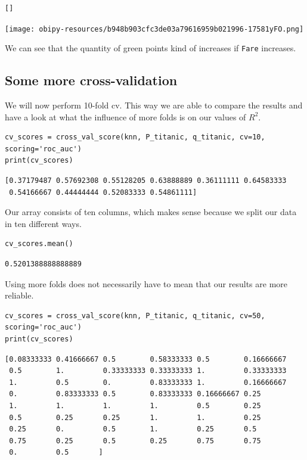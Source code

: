 \documentclass[11pt]{article}
\begin{document}
\begin{verbatim}
[]
\end{verbatim}



\begin{center}
\texttt{[image: obipy-resources/b948b903cfc3de03a79616959b021996-17581yFO.png]}
\end{center}

We can see that the quantity of green points kind of increases if  \texttt{Fare} increases.

\newpage
\subsection{Some more cross-validation}
\label{sec:orgd51032d}
We will now perform 10-fold cv. This way we are able to compare the results and have a look at what the influence of more folds is on our values of \(R^{2}\).

\begin{verbatim}
cv_scores = cross_val_score(knn, P_titanic, q_titanic, cv=10, scoring='roc_auc')
print(cv_scores)
\end{verbatim}

\begin{verbatim}
[0.37179487 0.57692308 0.55128205 0.63888889 0.36111111 0.64583333
 0.54166667 0.44444444 0.52083333 0.54861111]

\end{verbatim}

Our array consists of ten columns, which makes sense because we split our data in ten different ways. 

\begin{verbatim}
cv_scores.mean()
\end{verbatim}

\begin{verbatim}
0.5201388888888889
\end{verbatim}

Using more folds does not necessarily have to mean that our results are more reliable. 

\begin{verbatim}
cv_scores = cross_val_score(knn, P_titanic, q_titanic, cv=50, scoring='roc_auc')
print(cv_scores)
\end{verbatim}

\begin{verbatim}
[0.08333333 0.41666667 0.5        0.58333333 0.5        0.16666667
 0.5        1.         0.33333333 0.33333333 1.         0.33333333
 1.         0.5        0.         0.83333333 1.         0.16666667
 0.         0.83333333 0.5        0.83333333 0.16666667 0.25
 1.         1.         1.         1.         0.5        0.25
 0.5        0.25       0.25       1.         1.         0.25
 0.25       0.         0.5        1.         0.25       0.5
 0.75       0.25       0.5        0.25       0.75       0.75
 0.         0.5       ]

\end{verbatim}
\end{document}

